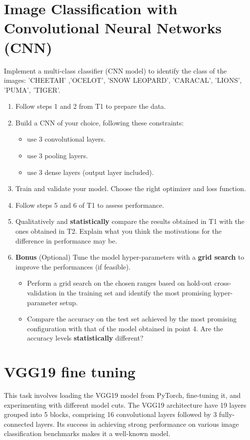 \documentclass[11pt]{scrartcl}
\begin{document}
\section{Image Classification with Convolutional Neural Networks (CNN)}

Implement a multi-class classifier (CNN model) to identify the class of the images: 'CHEETAH' ,'OCELOT', 'SNOW LEOPARD', 'CARACAL', 'LIONS', 'PUMA', 'TIGER'.

\begin{enumerate}
\item Follow steps 1 and 2 from T1 to prepare the data.
\item Build a CNN of your choice, following these constraints: 
\begin{itemize}
\item use 3 convolutional layers.
\item use 3 pooling layers.
\item use 3 dense layers (output layer included).
\end{itemize}
\item Train and validate your model. Choose the right optimizer and loss function. 
\item Follow steps 5 and 6 of T1 to assess performance.
\item Qualitatively and \textbf{statistically} compare the results obtained in T1 with the ones obtained in T2. Explain what you think the motivations for the difference in performance may be.
\item \textbf{Bonus} (Optional) Tune the model hyper-parameters with a \textbf{grid search} to improve the performances (if feasible).
\begin{itemize}
\item Perform a grid search on the chosen ranges based on hold-out cross-validation in the training set and identify the most promising hyper-parameter setup.
\item Compare the accuracy on the test set achieved by the most promising configuration with that of the model obtained in point 4. Are the accuracy levels \textbf{statistically} different?
\end{itemize}
\end{enumerate}

\newpage
\section{VGG19 fine tuning}

This task involves loading the VGG19 model from PyTorch, fine-tuning it, and experimenting with different model cuts.
The VGG19 architecture have 19 layers grouped into 5 blocks, comprising 16 convolutional layers followed by 3 fully-connected layers. Its success in achieving strong performance on various image classification benchmarks makes it a well-known model.
\end{document}

